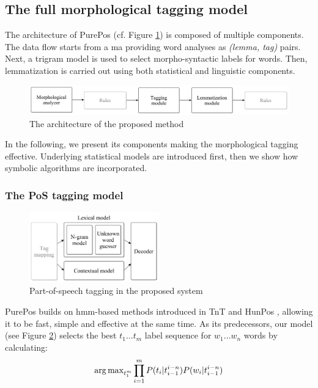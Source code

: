\subsection{The full morphological tagging model}
\label{sec:purepos}

The architecture of PurePos (cf. Figure \ref{fig:purepos-arch}) is composed of multiple components. 
The data flow starts from a \gls{ma} providing word analyses as \emph{(lemma, tag)} pairs. 
Next, a trigram model is used to select morpho-syntactic labels for words. 
Then, lemmatization is carried out using both statistical and linguistic components. 

\begin{figure}[H]
  \centering
  \includegraphics[width=1\textwidth]{MorphTagging/architecture.png} 
  \caption{The architecture of the proposed method}
  \label{fig:purepos-arch}
\end{figure}

In the following, we present its components making the morphological tagging effective. 
Underlying statistical models are introduced first, then we show how symbolic algorithms are incorporated. 

\subsubsection{The PoS tagging model}

\begin{figure}[H]
  \centering
  \includegraphics[width=0.5\textwidth]{MorphTagging/pos_arch.png} 
  \caption{Part-of-speech tagging in the proposed system}
  \label{fig:pos_arch}
\end{figure}

PurePos builds on \acrshort{hmm}-based methods \cite{Rabiner1989,Samuelsson1993} introduced in TnT \cite{Brants2000} and HunPos \cite{Halacsy2007}, allowing it to be fast, simple and effective at the same time. 
As its predecessors, our model (see Figure \ref{fig:pos_arch}) selects the best $t_1 \dots t_m$ label sequence for $w_1 \dots w_n$ words by calculating:
\begin{equation}
\operatorname{arg\,max}_{t_1^m} \prod_{i=1}^m P(t_i | t_{i-1}^{i-n}) P(w_i|t_{i-1}^{i-n})
\end{equation}

